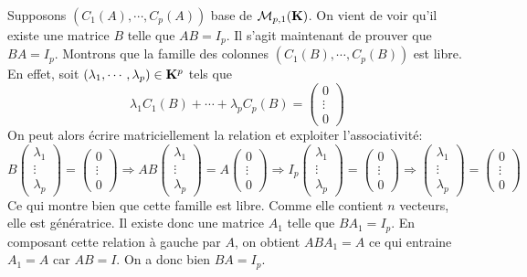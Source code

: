 \begin{demo}
Supposons $(C_1(A),\cdots,C_p(A))$ base de $\mathcal M_{p,1}(\mathbf{K})$. On vient de voir qu'il existe une matrice $B$ telle que $AB=I_p$. Il s'agit maintenant de prouver que $BA=I_p$.\newline
Montrons que la famille des colonnes $(C_1(B),\cdots,C_p(B))$ est libre.\newline
En effet, soit $(\lambda_1,\cdots,\lambda_p)\in\mathbf{K}^p$ tels que
\begin{displaymath}
 \lambda_1C_1(B)+\cdots + \lambda_pC_p(B)=
\begin{pmatrix}
0 \\  \vdots \\ 0 
\end{pmatrix}
\end{displaymath}
On peut alors écrire matriciellement la relation et exploiter l'associativité:
\begin{displaymath}
 B
\begin{pmatrix}
\lambda_1 \\  \vdots \\ \lambda_p
\end{pmatrix}=
\begin{pmatrix}
0 \\  \vdots \\ 0 
\end{pmatrix}
\Rightarrow 
AB
\begin{pmatrix}
\lambda_1 \\  \vdots \\ \lambda_p
\end{pmatrix}
=A
\begin{pmatrix}
0 \\  \vdots \\ 0 
\end{pmatrix}
\Rightarrow
I_p \begin{pmatrix}
\lambda_1 \\  \vdots \\ \lambda_p
\end{pmatrix}
=\begin{pmatrix}
0 \\  \vdots \\ 0 
\end{pmatrix}
\Rightarrow
\begin{pmatrix}
\lambda_1 \\  \vdots \\ \lambda_p
\end{pmatrix}
=\begin{pmatrix}
0 \\  \vdots \\ 0 
\end{pmatrix}
\end{displaymath}
Ce qui montre bien que cette famille est libre. Comme elle contient $n$ vecteurs, elle est génératrice. Il existe donc une matrice $A_1$ telle que $BA_1=I_p$. En composant cette relation à gauche par $A$, on obtient $ABA_1=A$ ce qui entraine $A_1=A$ car $AB=I$. On a donc bien $BA=I_p$.
\end{demo}
